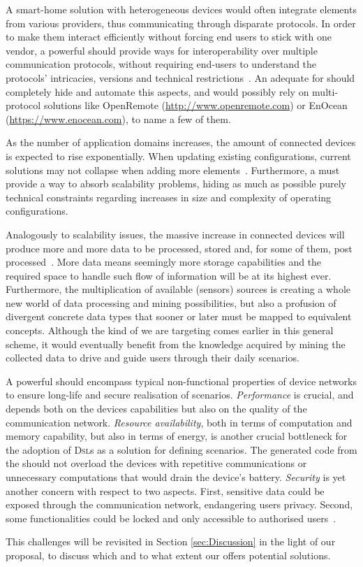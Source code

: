 \begin{description}[leftmargin=0cm]
	\item[Protocol Interoperability] A smart-home solution with heterogeneous devices would often integrate elements from various providers, thus communicating through disparate protocols. In order to make them interact efficiently without forcing end users to stick with one vendor, a powerful \DSL should provide ways for interoperability over multiple communication protocols, without requiring end-users to understand the protocols' intricacies, versions and technical restrictions~\cite{gubbi-13}. An adequate \DSL for \IOT should completely hide and automate this aspects, and would possibly rely on multi-protocol solutions like OpenRemote (\url{http://www.openremote.com}) or EnOcean (\url{https://www.enocean.com}), to name a few of them. 
	
	\item[Scalability] As the number of application domains increases, the amount of connected devices is expected to rise exponentially. When updating existing \IOT configurations, current solutions may not collapse when adding more elements~\cite{mukho-14}. Furthermore, a \DSL must provide a way to absorb scalability problems, hiding as much as possible purely technical constraints regarding increases in size and complexity of operating configurations. 
	
	\item[Data Management] Analogously to scalability issues, the massive increase in connected devices will produce more and more data to be processed, stored and, for some of them, post processed~\cite{lee-15}. More data means seemingly more storage capabilities and the required space to handle such flow of information will be at its highest ever. Furthermore, the multiplication of available (sensors) sources is creating a whole new world of data processing and mining possibilities, but also a profusion of divergent concrete data types that sooner or later must be mapped to equivalent concepts. Although the kind of \DSL we are targeting comes earlier in this general scheme, it would eventually benefit from the knowledge acquired by mining the collected data to drive and guide users through their daily scenarios.
	
	\item[Non-Functional Properties] A powerful \DSL should encompass typical non-functional properties of device networks to ensure long-life and secure realisation of scenarios. \emph{Performance} is crucial, and depends both on the devices capabilities but also on the quality of the communication network. \emph{Resource availability}, both in terms of computation and memory capability, but also in terms of energy, is another crucial bottleneck for the adoption of \textsc{Dsl}s as a solution for defining scenarios. The generated code from the \DSL should not overload the devices with repetitive communications or unnecessary computations that would drain the device's battery. \emph{Security} is yet another concern with respect to two aspects. First, sensitive data could be exposed through the communication network, endangering users privacy. Second, some functionalities could be locked and only accessible to authorised users~\cite{tan-10}.
\end{description}
This challenges will be revisited in Section \ref{sec:Discussion} in the light of our proposal, to discuss which and to what extent our \DSL offers potential solutions.
